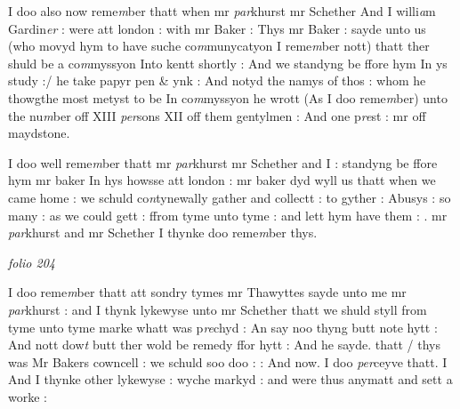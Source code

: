 \documentclass[12pt, a4paper]{book}
\begin{document}
            			
				\marginpar[\vspace{0.5cm}{\textcolor{Gray}{m}}]{}
			
            			
		\ifthenelse{\isodd{\thepage}}
		{\reversemarginpar}
		{\normalmarginpar}
		I doo also now reme\textit{m}ber thatt when mr \textit{par}khurst mr Schether
And I willi\textit{a}m Gardin\textit{er} : were att london : with mr Baker : Thys 
 mr Baker : sayde unto us (who movyd hym to have suche
co\textit{m}munycatyon I reme\textit{m}ber nott) thatt ther shuld be a co\textit{m}myssyon
 Into kentt shortly : And we standyng be ffore hym In ys
study :/ he take papyr pen \& ynk : And notyd the namys 
 of thos : whom he thowgthe most metyst to be In co\textit{m}myssyon
he wrott (As I doo reme\textit{m}ber) unto the nu\textit{m}ber off XIII \textit{per}sons
XII off them gentylmen : And one p\textit{re}st : mr off maydstone.
            		
            	
            		
				\marginpar[\vspace{0.5cm}{\textcolor{Gray}{Mr Baker}}]{}
			
            		
				\marginpar[\vspace{0.5cm}{\textcolor{Gray}{m}}]{}
			
            		
		\ifthenelse{\isodd{\thepage}}
		{\reversemarginpar}
		{\normalmarginpar}
		I doo well reme\textit{m}ber thatt mr \textit{par}khurst mr Schether and I : standyng
            		be ffore hym mr baker
			 In hys howsse att london : mr baker dyd wyll us
 thatt when we came home : we schuld co\textit{n}tynewally gather and
collectt : to gyther : Abusys : so many : as we could gett : ffrom tyme 
unto tyme : and lett hym have them : . mr \textit{par}khurst and mr
Schether I thynke doo reme\textit{m}ber thys.

\dotfill
						\newpage
{}

\textit{folio 204}


	
		
				\marginpar[\vspace{0.5cm}{\textcolor{Gray}{md}}]{}
			
		
			
		
		\ifthenelse{\isodd{\thepage}}
		{\reversemarginpar}
		{\normalmarginpar}
		I doo reme\textit{m}ber thatt att sondry tymes mr Thawyttes sayde unto me
 mr \textit{par}khurst : and I thynk lykewyse unto mr Schether thatt
we shuld styll from tyme unto tyme marke whatt was 
p\textit{re}chyd : An say noo thyng butt note hytt : And nott 
			dow\textit{t}
               butt 
			ther
wold be remedy ffor hytt : And he sayde. thatt / thys was 
			Mr Bakers cowncell : we schuld soo doo : : And now. I 
doo \textit{per}ceyve thatt. I And I thynke other lykewyse : wyche
markyd : and were thus anymatt and sett a worke :
	
\end{document}
